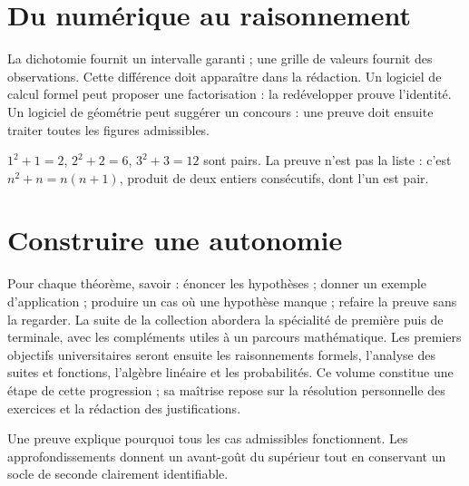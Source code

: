 \documentclass[../cours_2de.tex]{subfiles}
\begin{document}
\section{Du numérique au raisonnement}
La dichotomie fournit un intervalle garanti ; une grille de valeurs fournit des observations. Cette différence doit apparaître dans la rédaction.
Un logiciel de calcul formel peut proposer une factorisation : la redévelopper prouve l'identité.
Un logiciel de géométrie peut suggérer un concours : une preuve doit ensuite traiter toutes les figures admissibles.
\begin{exemple}
$1^2+1=2$, $2^2+2=6$, $3^2+3=12$ sont pairs. La preuve n'est pas la liste : c'est $n^2+n=n(n+1)$, produit de deux entiers consécutifs, dont l'un est pair.
\end{exemple}
\section{Construire une autonomie}
Pour chaque théorème, savoir : énoncer les hypothèses ; donner un exemple d'application ; produire un cas où une hypothèse manque ; refaire la preuve sans la regarder.
La suite de la collection abordera la spécialité de première puis de terminale, avec les compléments utiles à un parcours mathématique. Les premiers objectifs universitaires seront ensuite les raisonnements formels, l'analyse des suites et fonctions, l'algèbre linéaire et les probabilités.
Ce volume constitue une étape de cette progression ; sa maîtrise repose sur la résolution personnelle des exercices et la rédaction des justifications.
\begin{retenir}
Une preuve explique pourquoi tous les cas admissibles fonctionnent. Les approfondissements donnent un avant-goût du supérieur tout en conservant un socle de seconde clairement identifiable.
\end{retenir}
\end{document}
